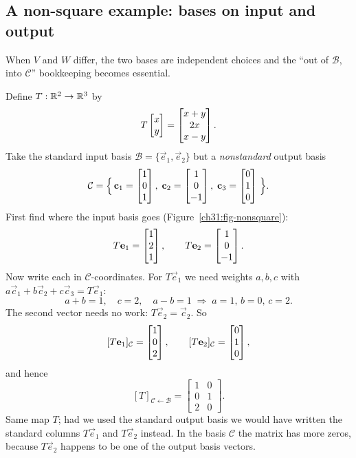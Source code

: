 \subsection{A non-square example: bases on input and output}
\label{ch31:nonsquare}

When $V$ and $W$ differ, the two bases are independent choices and the
``out of $\mathcal{B}$, into $\mathcal{C}$'' bookkeeping becomes essential.

\begin{example}
\label{ch31:ex-nonsquare}
Define $T:\mathbb{R}^2\to\mathbb{R}^3$ by
\[
  T\begin{bmatrix}x\\y\end{bmatrix}=\begin{bmatrix}x+y\\2x\\x-y\end{bmatrix}.
\]
Take the standard input basis
$\mathcal{B}=\{\vec{e}_1,\vec{e}_2\}$ but a \emph{nonstandard} output basis
\[
  \mathcal{C}=\Big\{\,\mathbf{c}_1=\begin{bmatrix}1\\0\\1\end{bmatrix},\;\mathbf{c}_2=\begin{bmatrix}1\\0\\-1\end{bmatrix},\;\mathbf{c}_3=\begin{bmatrix}0\\1\\0\end{bmatrix}\,\Big\}.
\]
First find where the input basis goes
(Figure~\ref{ch31:fig-nonsquare}):
\[
  T\mathbf{e}_1=\begin{bmatrix}1\\2\\1\end{bmatrix},\qquad T\mathbf{e}_2=\begin{bmatrix}1\\0\\-1\end{bmatrix}.
\]
Now write each in $\mathcal{C}$-coordinates. For $T\vec{e}_1$ we need
weights $a,b,c$ with $a\vec{c}_1+b\vec{c}_2+c\vec{c}_3=T\vec{e}_1$:
\[
  a+b=1,\quad c=2,\quad a-b=1 \;\Rightarrow\; a=1,\,b=0,\,c=2.
\]
The second vector needs no work: $T\vec{e}_2=\vec{c}_2$. So
\[
  [T\mathbf{e}_1]_{\mathcal{C}}=\begin{bmatrix}1\\0\\2\end{bmatrix},\qquad
  [T\mathbf{e}_2]_{\mathcal{C}}=\begin{bmatrix}0\\1\\0\end{bmatrix},
\]
and hence
\[
  [T]_{\mathcal{C}\leftarrow\mathcal{B}}
  = \begin{bmatrix} 1 & 0\\ 0 & 1\\ 2 & 0 \end{bmatrix}.
\]
Same map $T$; had we used the standard output basis we would have written the
standard columns $T\vec{e}_1$ and $T\vec{e}_2$ instead. In the basis
$\mathcal{C}$ the matrix has more zeros, because $T\vec{e}_2$ happens to be one
of the output basis vectors.
\end{example}


